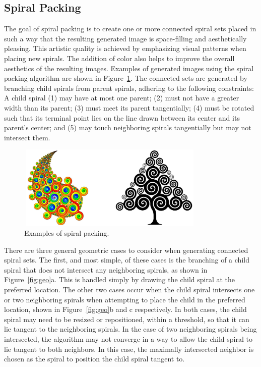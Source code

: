 \documentclass[11pt]{article}
\begin{document}
\subsection{Spiral Packing}
	The goal of spiral packing is to create one or more connected spiral sets placed in such a way that the resulting generated image is space-filling and aesthetically pleasing. This artistic quality is achieved by emphasizing visual patterns when placing new spirals. The addition of color also helps to improve the overall aesthetics of the resulting images. Examples of generated images using the spiral packing algorithm are shown in Figure~\ref{fig:example}. 
	The connected sets are generated by branching child spirals from parent spirals, adhering to the following constraints: A child spiral (1) may have at most one parent; (2) must not have a greater width than its parent; (3) must meet its parent tangentially; (4) must be rotated such that its terminal point lies on the line drawn between its center and its parent's center; and (5) may touch neighboring spirals tangentially but may not intersect them.
	
\begin{figure}[ht]
	\centering
	\includegraphics[width=90mm,height=40mm]{spiral-packing-example}
	\caption{Examples of spiral packing. \cite{Browne2006834}}
	\label{fig:example}
\end{figure}

	There are three general geometric cases to consider when generating connected spiral sets. The first, and most simple, of these cases is the branching of a child spiral that does not intersect any neighboring spirals, as shown in Figure~\ref{fig:geo}a. This is handled simply by drawing the child spiral at the preferred location. The other two cases occur when the child spiral intersects one or two neighboring spirals  when attempting to place the child in the preferred location, shown in Figure~\ref{fig:geo}b and c respectively. In both cases, the child spiral may need to be resized or repositioned, within a threshold, so that it can lie tangent to the neighboring spirals. In the case of two neighboring spirals being intersected, the algorithm may not converge in a way to allow the child spiral to lie tangent to both neighbors. In this case, the maximally intersected neighbor is chosen as the spiral to position the child spiral tangent to.
\end{document}
